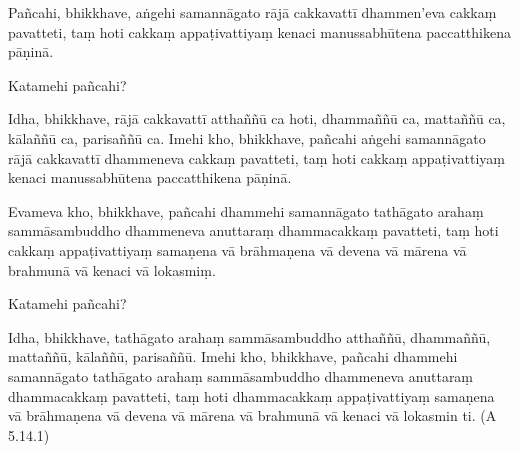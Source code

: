 Pañcahi, bhikkhave, aṅgehi samannāgato rājā cakkavattī dhammen’eva cakkaṃ pavatteti, taṃ hoti cakkaṃ appaṭivattiyaṃ kenaci manussabhūtena paccatthikena pāṇinā.

Katamehi pañcahi?

Idha, bhikkhave, rājā cakkavattī atthaññū ca hoti, dhammaññū ca, mattaññū ca, kālaññū ca, parisaññū ca. Imehi kho, bhikkhave, pañcahi aṅgehi samannāgato rājā cakkavattī dhammeneva cakkaṃ pavatteti, taṃ hoti cakkaṃ appaṭivattiyaṃ kenaci manussabhūtena paccatthikena pāṇinā.

Evameva kho, bhikkhave, pañcahi dhammehi samannāgato tathāgato arahaṃ sammāsambuddho dhammeneva anuttaraṃ dhammacakkaṃ pavatteti, taṃ hoti cakkaṃ appaṭivattiyaṃ samaṇena vā brāhmaṇena vā devena vā mārena vā brahmunā vā kenaci vā lokasmiṃ.

Katamehi pañcahi?

Idha, bhikkhave, tathāgato arahaṃ sammāsambuddho atthaññū, dhammaññū, mattaññū, kālaññū, parisaññū. Imehi kho, bhikkhave, pañcahi dhammehi samannāgato tathāgato arahaṃ sammāsambuddho dhammeneva anuttaraṃ dhammacakkaṃ pavatteti, taṃ hoti dhammacakkaṃ appaṭivattiyaṃ samaṇena vā brāhmaṇena vā devena vā mārena vā brahmunā vā kenaci vā lokasmin ti. \hfill(A 5.14.1)